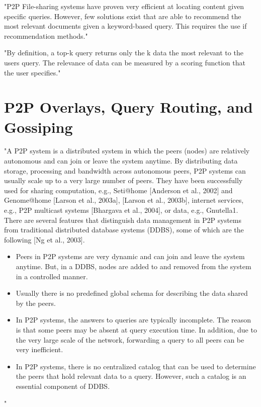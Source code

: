 "P2P File-sharing systems have proven very efficient at locating content given specific queries.
However, few solutions exist that are able to recommend the most relevant documents given a keyword-based query.
This requires the use if recommendation methods."\cite{book:p2p-mob}

"By definition, a top-k query returns only the k data the most relevant to the users query.
The relevance of data can be measured by a scoring function that the user specifies."\cite{book:p2p-mob}

\section{P2P Overlays, Query Routing, and Gossiping}

"A P2P system is a distributed system in which the peers (nodes) are relatively autonomous and can join or leave the system anytime.
By distributing data storage, processing and bandwidth across autonomous peers, P2P systems can usually scale up to a very large number of peers.
They have been successfully used for sharing computation, e.g., Seti@home [Anderson et al., 2002] and Genome@home [Larson et al., 2003a], [Larson et al., 2003b], internet services, e.g., P2P multicast systems [Bhargava et al., 2004], or data, e.g., Gnutella1.
There are several features that distinguish data management in P2P systems from traditional distributed database systems (DDBS), some of which are the following [Ng et al., 2003].
\begin{itemize}
	\item Peers in P2P systems are very dynamic and can join and leave the system anytime. But, in a
DDBS, nodes are added to and removed from the system in a controlled manner.
	\item Usually there is no predefined global schema for describing the data shared by the peers.
    \item In P2P systems, the answers to queries are typically incomplete. The reason is that some peers may be absent at query execution time. In addition, due to the very large scale of the network, forwarding a query to all peers can be very inefficient.
    \item In P2P systems, there is no centralized catalog that can be used to determine the peers that hold relevant data to a query. However, such a catalog is an essential component of DDBS.
\end{itemize}
"\cite{book:p2p-mob}


